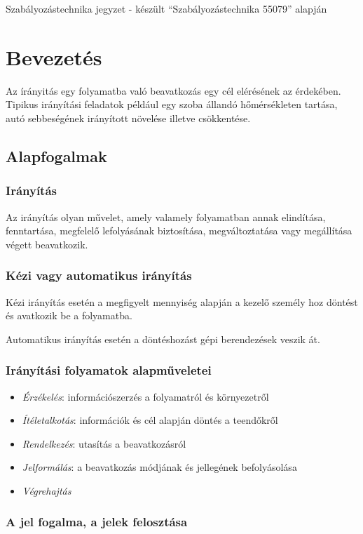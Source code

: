 \documentclass[a4paper,12pt]{book}
\begin{document}
Szabályozástechnika jegyzet - készült ``Szabályozástechnika 55079'' alapján

\chapter{Bevezetés}

Az írányitás egy folyamatba való beavatkozás egy cél elérésének az érdekében. Tipikus irányítási feladatok például egy szoba 
állandó hőmérsékleten tartása, autó sebbeségének irányított növelése illetve csökkentése. 

\section{Alapfogalmak}

\subsection*{Irányítás}
Az irányítás olyan művelet, amely valamely folyamatban annak elindítása, fenntartása, megfelelő lefolyásának biztosítása, megváltoztatása 
vagy megállítása végett beavatkozik. 

\subsection*{Kézi vagy automatikus irányítás}
Kézi irányítás esetén a megfigyelt mennyiség alapján a kezelő személy hoz döntést és avatkozik be a folyamatba. 

\noindent Automatikus irányítás esetén a döntéshozást gépi berendezések veszik át. 

\subsection*{Irányítási folyamatok alapműveletei}
\begin{itemize} 
\item{\emph{Érzékelés}: információszerzés a folyamatról és környezetről}
\item{\emph{Ítéletalkotás}: információk és cél alapján döntés a teendőkről }
\item{\emph{Rendelkezés}: utasítás a beavatkozásról }
\item{\emph{Jelformálás}: a beavatkozás módjának és jellegének befolyásolása}
\item{\emph{Végrehajtás}}
\end{itemize}

\subsection*{A jel fogalma, a jelek felosztása}
\end{document}
